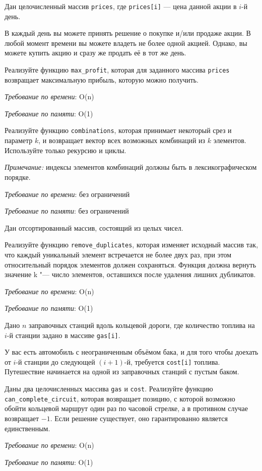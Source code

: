 \documentclass[a4paper, 10pt]{extarticle}
\begin{document}
\begin{tsk}
    Дан целочисленный массив \texttt{prices}, где \texttt{prices[i]} --- цена данной акции в \( i \)-й день.

    В каждый день вы можете принять решение о покупке и/или продаже акции. В любой момент времени вы можете владеть не более одной акцией. Однако, вы можете купить акцию и сразу же продать её в тот же день.
    
    Реализуйте функцию \verb|max_profit|, которая для заданного массива \verb|prices| возвращает 
    максимальную прибыль, которую можно получить.

    \textit{Требование по времени}: O(n)

    \textit{Требование по памяти}: O(1)
\end{tsk}

\begin{tsk}
    Реализуйте функцию \verb|combinations|, которая принимает некоторый срез и параметр $k$, и возвращает вектор всех возможных комбинаций из $k$ элементов. Используйте только рекурсию и циклы.

    \textit{Примечание:} индексы элементов комбинаций должны быть в лексикографическом порядке.

    \textit{Требование по времени}: без ограничений

    \textit{Требование по памяти}: без ограничений
\end{tsk}

\begin{tsk}
    Дан отсортированный массив, состоящий из целых чисел.

    Реализуйте функцию \verb|remove_duplicates|, которая изменяет исходный массив так, что каждый уникальный элемент встречается не более двух раз, при этом относительный порядок элементов должен сохраняться. Функция должна вернуть значение k "--- число элементов, оставшихся после удаления лишних дубликатов.

    
    \textit{Требование по времени}: O(n)

    \textit{Требование по памяти}: O(1)
\end{tsk}

\begin{tsk}
    Дано $n$ заправочных станций вдоль кольцевой дороги, где количество топлива на $i$-й станции задано в массиве \verb|gas[i]|.

    У вас есть автомобиль с неограниченным объёмом бака, и для того чтобы доехать от $i$-й станции до следующей $(i + 1)$-й, требуется \verb|cost[i]| топлива. Путешествие начинается на одной из заправочных станций с пустым баком.
    
    Даны два целочисленных массива \verb|gas| и \verb|cost|. Реализуйте функцию \verb|can_complete_circuit|, которая возвращает позицию, с которой возможно обойти кольцевой маршрут один раз по часовой стрелке, а в противном случае возвращает $-1$. Если решение существует, оно гарантированно является единственным.

    \textit{Требование по времени}: O(n)

    \textit{Требование по памяти}: O(1)
\end{tsk}
\end{document}

